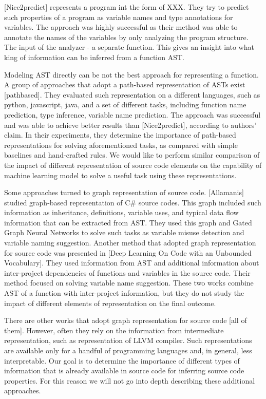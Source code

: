\documentclass[a4paper,twoside]{article}
\begin{document}
[Nice2predict] represents a program int the form of XXX. They try to predict such properties of a program as variable names and type annotations for variables. The approach was highly successful as their method was able to annotate the names of the variables by only analyzing the program structure. The input of the analyzer - a separate function. This gives an insight into what king of information can be inferred from a function AST.

Modeling AST directly can be not the best approach for representing a function. A group of approaches that adopt a path-based representation of ASTs exist [pathbased]. They evaluated such representation on a different languages, such as python, javascript, java, and a set of different tasks, including function name prediction, type inference, variable name prediction. The approach was successful and was able to achieve better results than [Nice2predict], according to authors' claim. In their experiments, they determine the importance of path-based representations for solving aforementioned tasks, as compared with simple baselines and hand-crafted rules. We would like to perform similar comparison of the impact of different representation of source code elements on the capability of machine learning model to solve a useful task using these representations.

Some approaches turned to graph representation of source code. [Allamanis] studied graph-based representation of C\# source codes. This graph included such information as inheritance, definitions, variable uses, and typical data flow information that can be extracted from AST. They used this graph and Gated Graph Neural Networks to solve such tasks as variable misuse detection and variable naming suggestion. Another method that adopted graph representation for source code was presented in [Deep Learning On Code with an Unbounded Vocabulary]. They used information from AST and additional information about inter-project dependencies of functions and variables in the source code. Their method focused on solving variable name suggestion. These two works combine AST of a function with inter-project information, but they do not study the impact of different elements of representation on the final outcome. 

There are other works that adopt graph representation for source code [all of them]. However, often they rely on the information from intermediate representation, such as representation of LLVM compiler. Such representations are available only for a handful of programming languages and, in general, less interpretable. Our goal is to determine the importance of different types of information that is already available in source code for inferring source code properties. For this reason we will not go into depth describing these additional approaches. 
\end{document}
